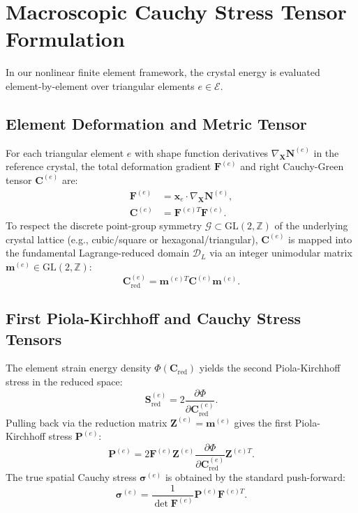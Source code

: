 \documentclass[11pt,a4paper]{article}
\begin{document}
\section{Macroscopic Cauchy Stress Tensor Formulation}

In our nonlinear finite element framework, the crystal energy is evaluated element-by-element over triangular elements $e \in \mathcal{E}$.

\subsection{Element Deformation and Metric Tensor}

For each triangular element $e$ with shape function derivatives $\nabla_{\mathbf{X}} \mathbf{N}^{(e)}$ in the reference crystal, the total deformation gradient $\mathbf{F}^{(e)}$ and right Cauchy-Green tensor $\mathbf{C}^{(e)}$ are:
\begin{align}
\mathbf{F}^{(e)} &= \mathbf{x}_e \cdot \nabla_{\mathbf{X}} \mathbf{N}^{(e)}, \\
\mathbf{C}^{(e)} &= \mathbf{F}^{(e)T} \mathbf{F}^{(e)}.
\end{align}
To respect the discrete point-group symmetry $\mathcal{G} \subset \mathrm{GL}(2, \mathbb{Z})$ of the underlying crystal lattice (e.g., cubic/square or hexagonal/triangular), $\mathbf{C}^{(e)}$ is mapped into the fundamental Lagrange-reduced domain $\mathcal{D}_L$ via an integer unimodular matrix $\mathbf{m}^{(e)} \in \mathrm{GL}(2, \mathbb{Z})$:
\begin{equation}
\mathbf{C}_{\text{red}}^{(e)} = \mathbf{m}^{(e)T} \mathbf{C}^{(e)} \mathbf{m}^{(e)}.
\end{equation}

\subsection{First Piola-Kirchhoff and Cauchy Stress Tensors}

The element strain energy density $\Phi(\mathbf{C}_{\text{red}})$ yields the second Piola-Kirchhoff stress in the reduced space:
\begin{equation}
\mathbf{S}_{\text{red}}^{(e)} = 2 \frac{\partial \Phi}{\partial \mathbf{C}_{\text{red}}^{(e)}}.
\end{equation}
Pulling back via the reduction matrix $\mathbf{Z}^{(e)} = \mathbf{m}^{(e)}$ gives the first Piola-Kirchhoff stress $\mathbf{P}^{(e)}$:
\begin{equation}
\mathbf{P}^{(e)} = 2 \mathbf{F}^{(e)} \mathbf{Z}^{(e)} \frac{\partial \Phi}{\partial \mathbf{C}_{\text{red}}^{(e)}} \mathbf{Z}^{(e)T}.
\end{equation}
The true spatial Cauchy stress $\boldsymbol{\sigma}^{(e)}$ is obtained by the standard push-forward:
\begin{equation}
\boldsymbol{\sigma}^{(e)} = \frac{1}{\det \mathbf{F}^{(e)}} \mathbf{P}^{(e)} \mathbf{F}^{(e)T}.
\end{equation}
\end{document}
